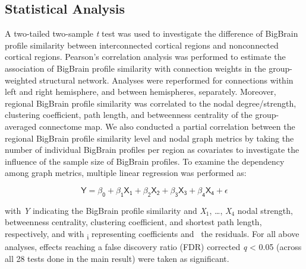 \begin{refsection}
\subsection*{Statistical Analysis}
A two-tailed two-sample \textit{t} test was used to investigate the difference of BigBrain profile similarity between interconnected cortical regions and nonconnected cortical regions. Pearson's correlation analysis was performed to estimate the association of BigBrain profile similarity with connection weights in the group-weighted structural network. Analyses were reperformed for connections within left and right hemisphere, and between hemispheres, separately. Moreover, regional BigBrain profile similarity was correlated to the nodal degree/strength, clustering coefficient, path length, and betweenness centrality of the group-averaged connectome map. We also conducted a partial correlation between the regional BigBrain profile similarity level and nodal graph metrics by taking the number of individual BigBrain profiles per region as covariates to investigate the influence of the sample size of BigBrain profiles. To examine the dependency among graph metrics, multiple linear regression was performed as:

\[\mathsf{Y=\beta_0+\beta_1X_1+\beta_2X_2+\beta_3X_3+\beta_4X_4+\epsilon}\]

\noindent
with \textit{Y} indicating the BigBrain profile similarity and \textit{X}$_1$, …, \textit{X}$_4$ nodal strength, betweenness centrality, clustering coefficient, and shortest path length, respectively, and with \textbeta\textsubscript{i} representing coefficients and \textepsilon \ the residuals. For all above analyses, effects reaching a false discovery ratio (FDR) corrected \textit{q} < 0.05 (across all 28 tests done in the main result) were taken as significant.


\end{refsection}
